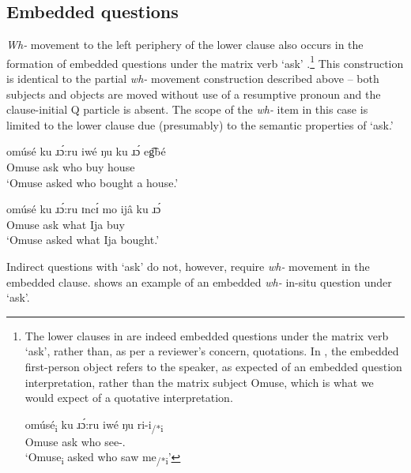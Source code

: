 \documentclass[output=paper,colorlinks,citecolor=brown
]{langscibook}
\begin{document}
\subsection{Embedded questions} \label{sec:matte:3.3}

\textit{Wh-} movement to the left periphery of the lower clause also occurs in the formation of embedded questions under the matrix verb `ask' .\footnote{The 
    lower clauses in  are indeed embedded questions under the matrix verb `ask', rather than, as per a reviewer’s concern, quotations. In , the embedded first-person object refers to the speaker, as expected of an embedded question interpretation, rather than the matrix subject Omuse, which is what we would expect of a quotative interpretation. 

    \ea \label{ex:matte:i}
        \gll omúsé\textsubscript{i}	ku	ɹɔ́:ru iwé	ŋu	{\longrule} ri-i\textsubscript{\Sp{}/*i}\\
    	Omuse \Pfv{} ask who \Foc{}	{} see-\Fsg{}.\Acc{}\\
        \glt `Omuse\textsubscript{i} asked who saw me\textsubscript{\Sp{}/*i}'
    
    \z
} This construction is identical to the partial \textit{wh-} movement construction described above – both subjects and objects are moved without use of a resumptive pronoun and the clause-initial Q particle is absent. The scope of the \textit{wh-} item in this case is limited to the lower clause due (presumably) to the semantic properties of `ask.'

\ea \label{ex:matte:18}
\begin{xlist}

\ex \label{ex:matte:18a}
\gll omúsé ku ɹɔ́:ru iwé ŋu {\longrule} ku ɹɔ́ eg͡bé\\
Omuse \Pfv{} ask who \Foc{} {} \Pfv{} buy house\\
\glt `Omuse asked who bought a house.'

\ex \label{ex:matte:18b}
\gll omúsé ku ɹɔ́:ru ɪncɪ́ mo ijâ ku ɹɔ́ {\longrule}\\
Omuse \Pfv{} ask what \Foc{} Ija \Pfv{} buy {}\\
\glt `Omuse asked what Ija bought.'

\end{xlist}
\z

Indirect questions with `ask' do not, however, require \textit{wh-} movement in the embedded clause.  shows an example of an embedded \textit{wh-} in-situ question under `ask'. 
\end{document}
